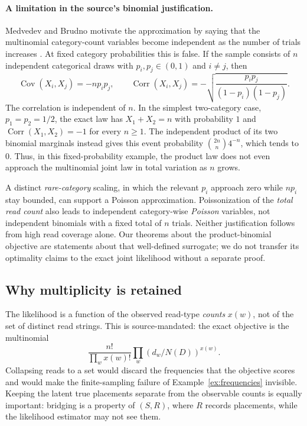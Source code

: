 \paragraph{A limitation in the source's binomial justification.}
Medvedev and Brudno motivate the approximation by saying that the multinomial
category-count variables become independent as the number of trials increases
\parencite[\S6.1]{medvedev2009}. At fixed category probabilities this is false.
If the sample consists of $n$ independent categorical draws with
$p_i,p_j\in(0,1)$ and $i\ne j$, then
\[
 \operatorname{Cov}(X_i,X_j)=-np_ip_j,\qquad
 \operatorname{Corr}(X_i,X_j)
   =-\sqrt{\frac{p_ip_j}{(1-p_i)(1-p_j)}}.
\]
The correlation is independent of $n$. In the simplest two-category case,
$p_1=p_2=1/2$, the exact law has $X_1+X_2=n$ with probability $1$ and
$\operatorname{Corr}(X_1,X_2)=-1$ for every $n\ge1$. The independent product
of its two binomial marginals instead gives this event probability
$\binom{2n}{n}4^{-n}$, which tends to $0$. Thus, in this fixed-probability
example, the product law does not even approach the multinomial joint law
in total variation as $n$ grows.

A distinct \emph{rare-category} scaling, in which the relevant $p_i$
approach zero while $np_i$ stay bounded, can support a Poisson
approximation. Poissonization of the \emph{total read count} also leads to
independent category-wise \emph{Poisson} variables, not independent
binomials with a fixed total of $n$ trials. Neither justification follows
from high read coverage alone. Our theorems about the product-binomial
objective are statements about that well-defined surrogate; we do not
transfer its optimality claims to the exact joint likelihood without a
separate proof.

\subsection{Why multiplicity is retained}

The likelihood is a function of the observed read-type \emph{counts}
$x(w)$, not of the set of distinct read strings. This is source-mandated: the
exact objective is the multinomial
\[
  \frac{n!}{\prod_w x(w)!}\prod_w(d_w/N(D))^{x(w)}.
\]
Collapsing reads to a set
would discard the frequencies that the objective scores and would make the
finite-sampling failure of Example~\ref{ex:frequencies} invisible. Keeping the
latent true placements separate from the observable counts is equally important:
bridging is a property of $(S,R)$, where $R$ records placements, while the
likelihood estimator may not see them.

